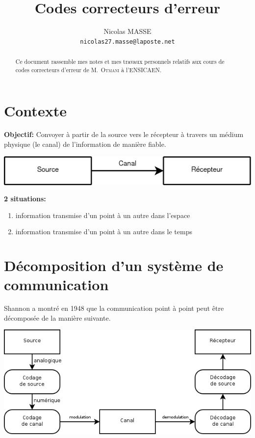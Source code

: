 \documentclass[a4paper,10pt,twocolumn]{article}
\title{Codes correcteurs d'erreur}
\author{Nicolas MASSE \\ \texttt{nicolas27.masse@laposte.net}}
\theoremstyle{break}
\begin{document}
\maketitle

\begin{abstract}
 Ce document rassemble mes notes et mes travaux personnels relatifs aux cours de codes correcteurs d'erreur de M.~\textsc{Otmani} à l'ENSICAEN.
\end{abstract}

\tableofcontents
\clearpage

\section{Contexte}
\textbf{Objectif:} Convoyer à partir de la source vers le récepteur à travers un médium physique (le canal) de l'information de manière fiable.

\includegraphics[width=\linewidth]{general1}

\textbf{2 situations:}
\begin{enumerate}
 \item information transmise d'un point à un autre dans l'espace
 \item information transmise d'un point à un autre dans le temps
\end{enumerate}

\section{Décomposition d'un système de communication}
Shannon a montré en 1948 que la communication point à point peut être décomposée de la manière suivante.

\includegraphics[width=\linewidth]{general2}
\end{document}
